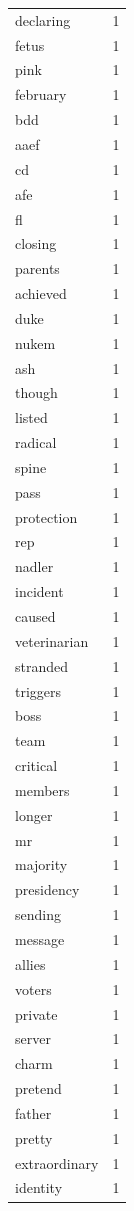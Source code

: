\begin{tabular}{lr}
declaring & 1 \\
fetus & 1 \\
pink & 1 \\
february & 1 \\
bdd & 1 \\
aaef & 1 \\
cd & 1 \\
afe & 1 \\
fl & 1 \\
closing & 1 \\
parents & 1 \\
achieved & 1 \\
duke & 1 \\
nukem & 1 \\
ash & 1 \\
though & 1 \\
listed & 1 \\
radical & 1 \\
spine & 1 \\
pass & 1 \\
protection & 1 \\
rep & 1 \\
nadler & 1 \\
incident & 1 \\
caused & 1 \\
veterinarian & 1 \\
stranded & 1 \\
triggers & 1 \\
boss & 1 \\
team & 1 \\
critical & 1 \\
members & 1 \\
longer & 1 \\
mr & 1 \\
majority & 1 \\
presidency & 1 \\
sending & 1 \\
message & 1 \\
allies & 1 \\
voters & 1 \\
private & 1 \\
server & 1 \\
charm & 1 \\
pretend & 1 \\
father & 1 \\
pretty & 1 \\
extraordinary & 1 \\
identity & 1 \\

\end{tabular}
